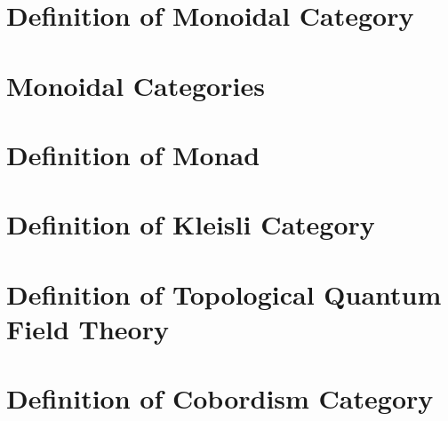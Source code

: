 \documentclass[a4paper, twoside, english, 11pt]{book}
\begin{document}
\section{Definition of Monoidal Category}
\section{Monoidal Categories}
\section{Definition of Monad}
\section{Definition of Kleisli Category}
\section{Definition of Topological Quantum Field Theory}
\section{Definition of Cobordism Category}
\end{document}
